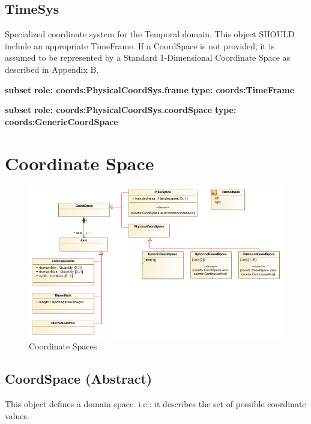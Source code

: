   \subsection{TimeSys}
  \label{sect:TimeSys}
    Specialized coordinate system for the Temporal domain. This object SHOULD include an appropriate TimeFrame. If a CoordSpace is not provided, it is assumed to be represented by a Standard 1-Dimensional Coordinate Space as described in Appendix B.

    \noindent \textbf{subset} \newline
    \indent   \textbf{role: coords:PhysicalCoordSys.frame} \newline
    \indent   \textbf{type: coords:TimeFrame} \newline


    \noindent \textbf{subset} \newline
    \indent   \textbf{role: coords:PhysicalCoordSys.coordSpace} \newline
    \indent   \textbf{type: coords:GenericCoordSpace} \newline


\pagebreak
\section{Coordinate Space}

  \begin{figure}[h]
  \begin{center}
    \includegraphics[width=5.25in]{diagrams/CoordSpace.png}
    \caption{Coordinate Spaces}\label{fig:coordspace}
  \end{center}
  \end{figure}

  \subsection{CoordSpace (Abstract)}
  \label{sect:CoordSpace}
    This object defines a domain space. i.e.: it describes the set of possible coordinate values.


